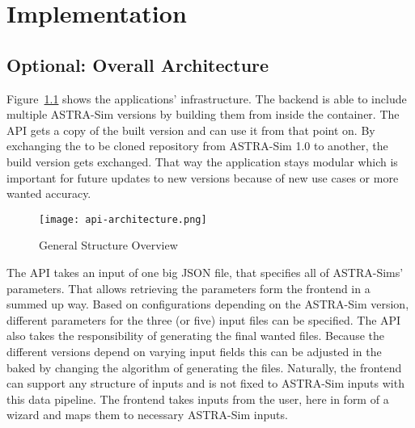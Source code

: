
\chapter{Implementation} %
\label{chap:implementation}

\section{Optional: Overall Architecture}


Figure~\ref{fig:architecture} shows the applications' infrastructure. 
The backend is able to include multiple \ac{ASTRA-Sim} versions by building them from inside the container. The \ac{API} gets a copy of the built version and can use it from that point on. By exchanging the to be cloned repository from \ac{ASTRA-Sim} 1.0 to another, the build version gets exchanged. That way the application stays modular which is important for future updates to new versions because of new use cases or more wanted accuracy. 

\begin{figure}[H]
    \centering
    \texttt{[image: api-architecture.png]}
    \caption{General Structure Overview}
    \label{fig:architecture}
\end{figure}

The \ac{API} takes an input of one big \ac{JSON} file, that specifies all of \acp{ASTRA-Sim}' parameters. That allows retrieving the parameters form the frontend in a summed up way. Based on configurations depending on the \ac{ASTRA-Sim} version, different parameters for the three (or five) input files can be specified. The \ac{API} also takes the responsibility of generating the final wanted files. Because the different versions depend on varying input fields this can be adjusted in the baked by changing the algorithm of generating the files.
Naturally, the frontend can support any structure of inputs and is not fixed to \ac{ASTRA-Sim} inputs with this data pipeline.
The frontend takes inputs from the user, here in form of a wizard and maps them to necessary \ac{ASTRA-Sim} inputs.



